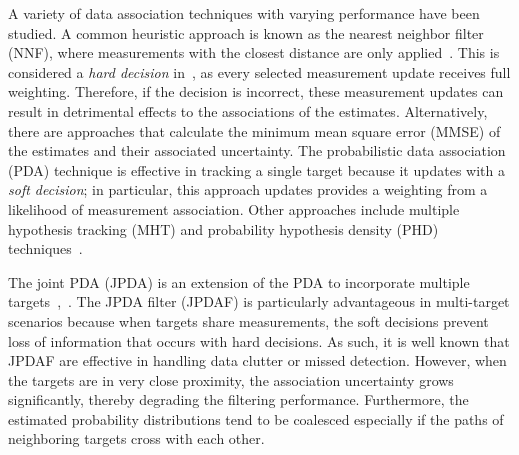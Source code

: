 \documentclass[letterpaper, 10pt, conference]{ieeeconf}
\begin{document}

A variety of data association techniques with varying performance have been studied. A common heuristic approach is known as the nearest neighbor filter (NNF), where measurements with the closest distance are only applied~\cite{NN2}. This is considered a \emph{hard decision} in~\cite{JPDAF1}, as every selected measurement update receives full weighting. Therefore, if the decision is incorrect, these measurement updates can result in detrimental effects to the associations of the estimates.  Alternatively, there are approaches that calculate the minimum mean square error (MMSE) of the estimates and their associated uncertainty. The probabilistic data association (PDA) technique is effective in tracking a single target because it updates with a \emph{soft decision}; in particular, this approach updates provides a weighting from a likelihood of measurement association. Other approaches include multiple hypothesis tracking (MHT) and probability hypothesis density (PHD) techniques~\cite{MHT1,PHD1,PHD2}. 



The joint PDA (JPDA) is an extension of the PDA to incorporate multiple targets~\cite{JPDAF1},~\cite{TrackDataAssoc}.
The JPDA filter (JPDAF) is particularly advantageous in multi-target scenarios because when targets share measurements, the soft decisions prevent loss of information that occurs with hard decisions. As such, it is well known that JPDAF are effective in handling data clutter or missed detection. However, when the targets are in very close proximity, the association uncertainty grows significantly, thereby degrading the filtering performance. Furthermore, the estimated probability distributions tend to be coalesced especially if the paths of neighboring targets cross with each other. 

\end{document}
